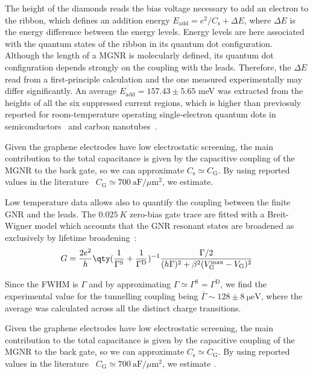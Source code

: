 The height of the diamonds reads the bias voltage necessary to add an electron to the ribbon, which defines an addition energy $E_\textrm{add} = e^2/C_\textrm{s} + \Delta E$, where $\Delta E$ is the energy difference between the energy levels. Energy levels are here associated with the quantum states of the ribbon in its quantum dot configuration. Although the length of a \gls{MGNR} is molecularly defined, its quantum dot configuration depends strongly on the coupling with the leads. Therefore, the $\Delta E$ read from a first-principle calculation and the one measured experimentally may differ significantly. An average $\overline{E_\textrm{add}} =  157.43\pm 5.65$ meV was extracted from the heights of all the six suppressed current regions, which is higher than previosuly reported for room-temperature operating single-electron quantum dots in semiconductors~\cite{zhuang1998silicon} and carbon nanotubes~\cite{postma2001carbon}.

Given the graphene electrodes have low electrostatic screening, the main contribution to the total capacitance is given by the capacitive coupling of the \gls{MGNR} to the back gate, so we can approximate $C_\textrm{s}\simeq C_\textrm{G}$. By using reported values in the literature~\cite{han2010electron} $C_\textrm{G}\simeq \SI{700}{\atto\farad}/\mu\textrm{m}^2$, we estimate.


Low temperature data allows also to quantify the coupling between the finite \gls{GNR} and the leads. The $\SI{0.025}{K}$ zero-bias gate trace are fitted with a Breit-Wigner model which accounts that the \gls{GNR} resonant states are broadened as exclusively by lifetime broadening~\cite{beenakker1991theory}:
\begin{equation}
  G = \frac{2e^2}{h}\qty(\frac{1}{\Gamma^\textrm{S}} + \frac{1}{\Gamma^\textrm{D}})^{-1}\frac{\Gamma/2}{(h\Gamma)^2 + \beta^2(V_\textrm{G}^\textrm{max} - V_\textrm{G})^2}
\end{equation}

Since the \gls{FWHM} is $\Gamma$ and by approximating $\Gamma\simeq\Gamma^\textrm{S}=\Gamma^\textrm{D}$, we find the experimental value for the tunnelling coupling being $\overline{\Gamma}\sim 128 \pm \SI{8}{\micro\eV}$, where the average was calculated across all the distinct charge transitions.

Given the graphene electrodes have low electrostatic screening, the main contribution to the total capacitance is given by the capacitive coupling of the \gls{MGNR} to the back gate, so we can approximate $C_\textrm{s}\simeq C_\textrm{G}$. By using reported values in the literature~\cite{han2010electron} $C_\textrm{G}\simeq \SI{700}{\atto\farad}/\mu\textrm{m}^2$, we estimate .

